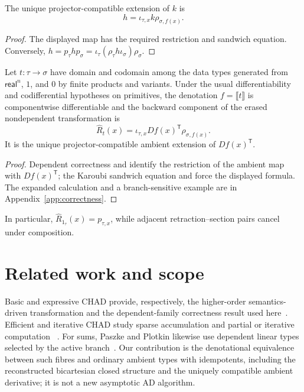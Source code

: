 \documentclass[runningheads,envcountsame]{llncs}
\begin{document}
\begin{lemma}
\label{lem:unique-ambient-extension}
The unique projector-compatible extension of $k$ is
$$
h=\iota_{\tau,x}k\rho_{\sigma,f(x)}.
$$
\end{lemma}

\begin{proof}
The displayed map has the required restriction and sandwich equation. Conversely,
$h=p_\tau hp_\sigma=\iota_\tau(\rho_\tau h\iota_\sigma)\rho_\sigma$.
\end{proof}

\begin{theorem}
\label{thm:ambient}
Let $t:\tau\to\sigma$ have domain and codomain among the data types generated
from $\mathsf{real}^n$, $1$, and $0$ by finite products and variants. Under the
usual differentiability and codifferential hypotheses on primitives, the
denotation $f=\llbracket t\rrbracket$ is componentwise differentiable and the
backward component of the erased nondependent transformation is
$$
\widehat R_t(x)
=
\iota_{\tau,x}Df(x)^{\mathsf T}\rho_{\sigma,f(x)}.
$$
It is the unique projector-compatible ambient extension of
$Df(x)^{\mathsf T}$.
\end{theorem}

\begin{proof}
Dependent correctness and  identify the restriction of the
ambient map with $Df(x)^{\mathsf T}$; the Karoubi sandwich equation and
 force the displayed formula. The expanded
calculation and a branch-sensitive example are in Appendix~\ref{app:correctness}.
\end{proof}

In particular, $\widehat R_{1_\tau}(x)=p_{\tau,x}$, while adjacent
retraction--section pairs cancel under composition.

\section{Related work and scope}

Basic and expressive CHAD provide, respectively, the higher-order
semantics-driven transformation and the dependent-family correctness result used
here~\cite{Vakar2021,VakarSmeding2022,LucatelliNunesVakar2023}. Efficient and
iterative CHAD study sparse accumulation and partial or iterative computation
~\cite{SmedingVakar2024,LucatelliNunesVakar2024ML,LucatelliNunesPlotkinVakar2025}.
For sums, Paszke and Plotkin likewise use dependent linear types selected by the
active branch~\cite{PaszkePlotkin2023}. Our contribution is the denotational
equivalence between such fibres and ordinary ambient types with idempotents,
including the reconstructed bicartesian closed structure and the uniquely
compatible ambient derivative; it is not a new asymptotic AD algorithm.
\end{document}
